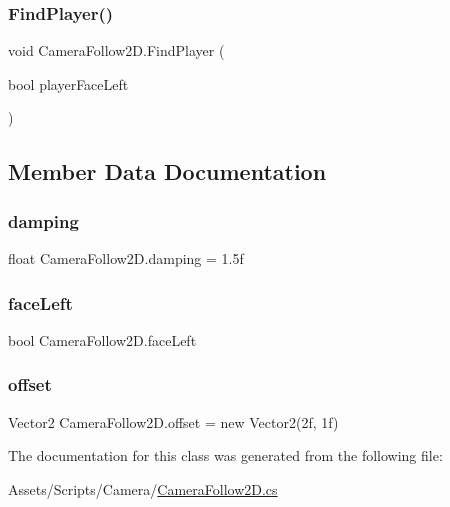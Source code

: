\subsubsection{\texorpdfstring{Find\+Player()}{FindPlayer()}}
{\footnotesize\ttfamily void Camera\+Follow2\+D.\+Find\+Player (\begin{DoxyParamCaption}\item[{bool}]{player\+Face\+Left }\end{DoxyParamCaption})\hspace{0.3cm}{\ttfamily [inline]}}



\subsection{Member Data Documentation}
\mbox{\label{class_camera_follow2_d_a37c1fc15ec814895aac4cfaef0112682}} 
\subsubsection{\texorpdfstring{damping}{damping}}
{\footnotesize\ttfamily float Camera\+Follow2\+D.\+damping = 1.\+5f}

\mbox{\label{class_camera_follow2_d_ac2decd0164a2ea91bfc21fce22561c97}} 
\subsubsection{\texorpdfstring{face\+Left}{faceLeft}}
{\footnotesize\ttfamily bool Camera\+Follow2\+D.\+face\+Left}

\mbox{\label{class_camera_follow2_d_ad20b2de59ea17dac96326e9a1471564d}} 
\subsubsection{\texorpdfstring{offset}{offset}}
{\footnotesize\ttfamily Vector2 Camera\+Follow2\+D.\+offset = new Vector2(2f, 1f)}



The documentation for this class was generated from the following file\+:\begin{DoxyCompactItemize}
\item 
Assets/\+Scripts/\+Camera/\mbox{\hyperlink{_camera_follow2_d_8cs}{Camera\+Follow2\+D.\+cs}}\end{DoxyCompactItemize}
